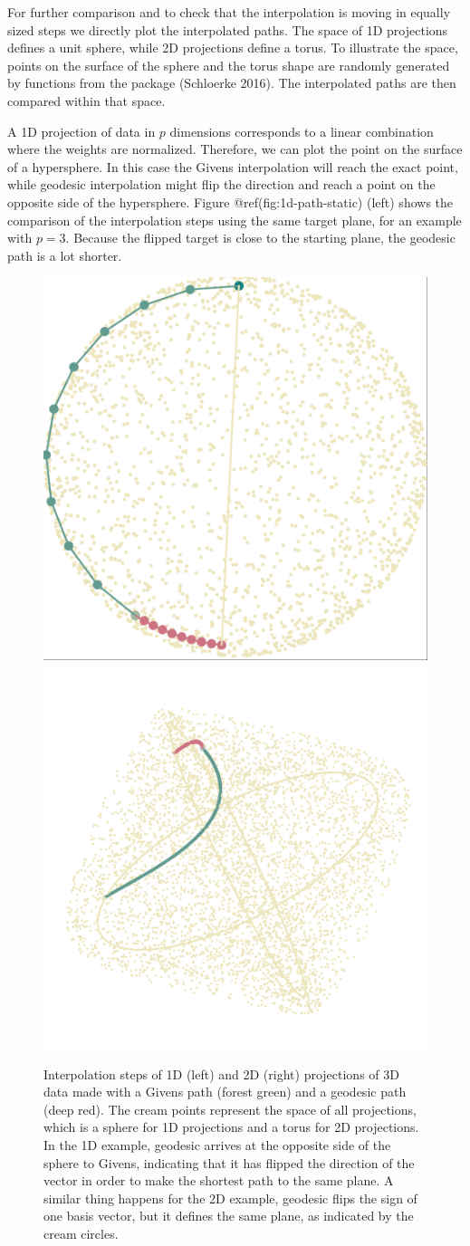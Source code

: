 \documentclass[
]{article}
\begin{document}
For further comparison and to check that the interpolation is moving in
equally sized steps we directly plot the interpolated paths. The space
of 1D projections defines a unit sphere, while 2D projections define a
torus. To illustrate the space, points on the surface of the sphere and
the torus shape are randomly generated by functions from the
 package (Schloerke 2016). The interpolated paths are
then compared within that space.

A 1D projection of data in \(p\) dimensions corresponds to a linear
combination where the weights are normalized. Therefore, we can plot the
point on the surface of a hypersphere. In this case the Givens
interpolation will reach the exact point, while geodesic interpolation
might flip the direction and reach a point on the opposite side of the
hypersphere. Figure @ref(fig:1d-path-static) (left) shows the comparison
of the interpolation steps using the same target plane, for an example
with \(p=3\). Because the flipped target is close to the starting plane,
the geodesic path is a lot shorter.

\begin{figure}

{\centering \includegraphics[width=0.45\linewidth]{figures/sphere_static} \includegraphics[width=0.45\linewidth]{figures/torus_static} 

}

\caption{Interpolation steps of 1D (left) and 2D (right) projections of 3D data made with a Givens path (forest green) and a geodesic path (deep red). The cream points represent the space of all projections, which is a sphere for 1D projections and a torus for 2D projections. In the 1D example, geodesic arrives at the opposite side of the sphere to Givens, indicating that it has flipped the direction of the vector in order to make the shortest path to the same plane. A similar thing happens for the 2D example, geodesic flips the sign of one basis vector, but it defines the same plane, as indicated by the cream circles.}\label{fig:1d-path-static}
\end{figure}
\end{document}
